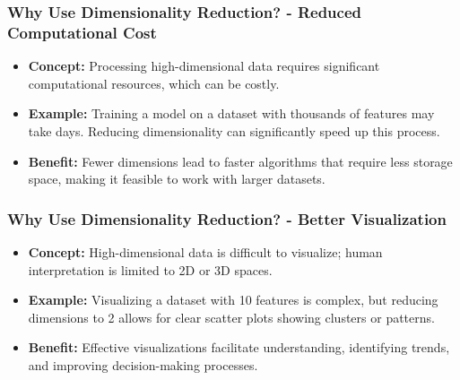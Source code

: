 \documentclass[aspectratio=169]{beamer}
\begin{document}
\begin{frame}[fragile]
    \frametitle{Why Use Dimensionality Reduction? - Reduced Computational Cost}
    \begin{itemize}
        \item \textbf{Concept:} 
            Processing high-dimensional data requires significant computational resources, which can be costly.
        \item \textbf{Example:} 
            Training a model on a dataset with thousands of features may take days. Reducing dimensionality can significantly speed up this process.
        \item \textbf{Benefit:} 
            Fewer dimensions lead to faster algorithms that require less storage space, making it feasible to work with larger datasets.
    \end{itemize}
\end{frame}

\begin{frame}[fragile]
    \frametitle{Why Use Dimensionality Reduction? - Better Visualization}
    \begin{itemize}
        \item \textbf{Concept:} 
            High-dimensional data is difficult to visualize; human interpretation is limited to 2D or 3D spaces.
        \item \textbf{Example:} 
            Visualizing a dataset with 10 features is complex, but reducing dimensions to 2 allows for clear scatter plots showing clusters or patterns.
        \item \textbf{Benefit:} 
            Effective visualizations facilitate understanding, identifying trends, and improving decision-making processes.
    \end{itemize}
\end{frame}
\end{document}

